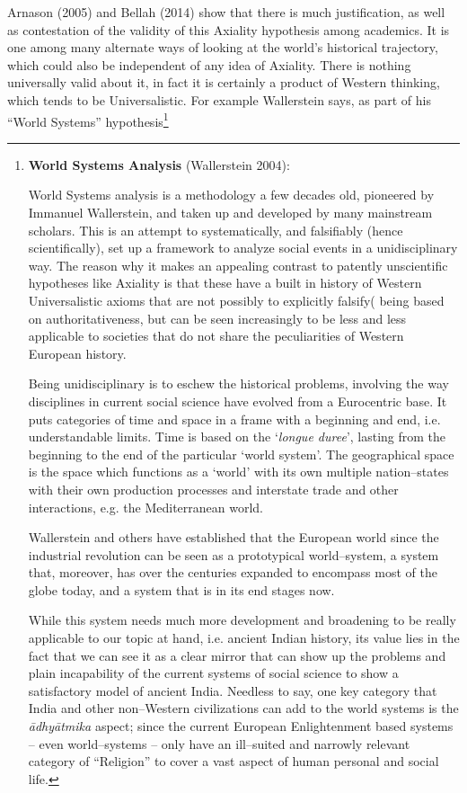 Arnason (2005) and Bellah (2014) show that there is much justification, as well as contestation of the validity of this Axiality hypothesis among academics. It is one among many alternate ways of looking at the world’s historical trajectory, which could also be independent of any idea of Axiality. There is nothing universally valid about it, in fact it is certainly a product of Western thinking, which tends to be Universalistic. For example Wallerstein says, as part of his “World Systems” hypothesis\footnote{ \textbf{World Systems Analysis} (Wallerstein 2004):

World Systems analysis is a methodology a few decades old, pioneered by Immanuel Wallerstein, and taken up and developed by many mainstream scholars. This is an attempt to systematically, and falsifiably (hence scientifically), set up a framework to analyze social events in a unidisciplinary way. The reason why it makes an appealing contrast to patently unscientific hypotheses like Axiality is that these have a built in history of Western Universalistic axioms that are not possibly to explicitly falsify( being based on authoritativeness, but can be seen increasingly to be less and less applicable to societies that do not share the peculiarities of Western European history.

Being unidisciplinary is to eschew the historical problems, involving the way disciplines in current social science have evolved from a Eurocentric base. It puts categories of time and space in a frame with a beginning and end, i.e. understandable limits. Time is based on the ‘\textit{longue duree}’, lasting from the beginning to the end of the particular ‘world system’. The geographical space is the space which functions as a ‘world’ with its own multiple nation–states with their own production processes and interstate trade and other interactions, e.g. the Mediterranean world.

Wallerstein and others have established that the European world since the industrial revolution can be seen as a prototypical world–system, a system that, moreover, has over the centuries expanded to encompass most of the globe today, and a system that is in its end stages now.

While this system needs much more development and broadening to be really applicable to our topic at hand, i.e. ancient Indian history, its value lies in the fact that we can see it as a clear mirror that can show up the problems and plain incapability of the current systems of social science to show a satisfactory model of ancient India. Needless to say, one key category that India and other non–Western civilizations can add to the world systems is the \textit{ādhyātmika} aspect; since the current European Enlightenment based systems – even world–systems – only have an ill–suited and narrowly relevant category of “Religion” to cover a vast aspect of human personal and social life.}

